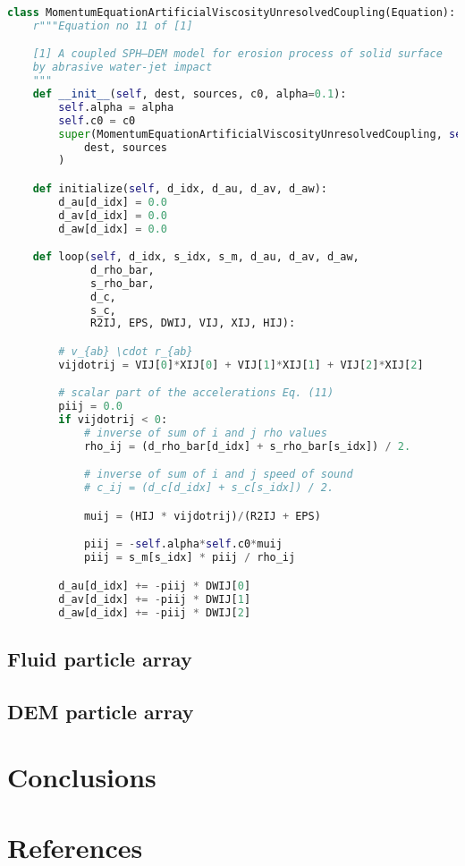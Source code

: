 \documentclass[preprint,12pt]{elsarticle}
\begin{document}
\begin{lstlisting}[label={contact:equations},frame=lines,language=Python,upquote=True]
class MomentumEquationArtificialViscosityUnresolvedCoupling(Equation):
    r"""Equation no 11 of [1]

    [1] A coupled SPH–DEM model for erosion process of solid surface
    by abrasive water-jet impact
    """
    def __init__(self, dest, sources, c0, alpha=0.1):
        self.alpha = alpha
        self.c0 = c0
        super(MomentumEquationArtificialViscosityUnresolvedCoupling, self).__init__(
            dest, sources
        )

    def initialize(self, d_idx, d_au, d_av, d_aw):
        d_au[d_idx] = 0.0
        d_av[d_idx] = 0.0
        d_aw[d_idx] = 0.0

    def loop(self, d_idx, s_idx, s_m, d_au, d_av, d_aw,
             d_rho_bar,
             s_rho_bar,
             d_c,
             s_c,
             R2IJ, EPS, DWIJ, VIJ, XIJ, HIJ):

        # v_{ab} \cdot r_{ab}
        vijdotrij = VIJ[0]*XIJ[0] + VIJ[1]*XIJ[1] + VIJ[2]*XIJ[2]

        # scalar part of the accelerations Eq. (11)
        piij = 0.0
        if vijdotrij < 0:
            # inverse of sum of i and j rho values
            rho_ij = (d_rho_bar[d_idx] + s_rho_bar[s_idx]) / 2.

            # inverse of sum of i and j speed of sound
            # c_ij = (d_c[d_idx] + s_c[s_idx]) / 2.

            muij = (HIJ * vijdotrij)/(R2IJ + EPS)

            piij = -self.alpha*self.c0*muij
            piij = s_m[s_idx] * piij / rho_ij

        d_au[d_idx] += -piij * DWIJ[0]
        d_av[d_idx] += -piij * DWIJ[1]
        d_aw[d_idx] += -piij * DWIJ[2]
\end{lstlisting}


\FloatBarrier%
\subsection{Fluid particle array}
\label{sec:}


\FloatBarrier%
\subsection{DEM particle array}
\label{sec:}



\FloatBarrier%
\section{Conclusions}
\label{sec:conclusions}


\section*{References}




\end{document}
